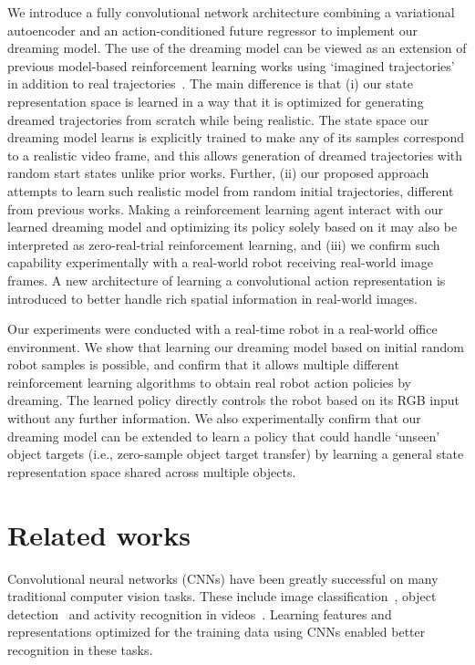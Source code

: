 \documentclass[letterpaper, 10 pt, conference]{ieeeconf}
\begin{document}
We introduce a fully convolutional network architecture combining a variational autoencoder and an action-conditioned future regressor to implement our dreaming model.
The use of the dreaming model can be viewed as an extension of previous model-based reinforcement learning works using `imagined trajectories' in addition to real trajectories~\cite{sutton1990integrated,heess2015learning,weber2017imagination}. The main difference is that (i) our state representation space is learned in a way that it is optimized for generating dreamed trajectories from scratch while being realistic.
The state space our dreaming model learns is explicitly trained to make any of its samples correspond to a realistic video frame, and this allows generation of dreamed trajectories with random start states unlike prior works. 
Further, (ii) our proposed approach attempts to learn such realistic model from random initial trajectories, different from previous works. Making a reinforcement learning agent interact with our learned dreaming model and optimizing its policy solely based on it may also be interpreted as zero-real-trial reinforcement learning, and (iii) we confirm such capability experimentally with a real-world robot receiving real-world image frames. A new architecture of learning a convolutional action representation is introduced to better handle rich spatial information in real-world images.


Our experiments were conducted with a real-time robot in a real-world office environment. We show that learning our dreaming model based on initial random robot samples is possible, and confirm that it allows multiple different reinforcement learning algorithms to obtain real robot action policies by dreaming. The learned policy directly controls the robot based on its RGB input without any further information. We also experimentally confirm that our dreaming model can be extended to learn a policy that could handle `unseen' object targets (i.e., zero-sample object target transfer) by learning a general state representation space shared across multiple objects.











\section{Related works}
Convolutional neural networks (CNNs) have been greatly successful on many traditional computer vision tasks. These include image classification~\cite{krizhevsky2012imagenet,simonyan2014very}, object detection~\cite{girshick2015fast,liu2016ssd} and activity recognition in videos~\cite{carreira2017quo,piergiovanni2018learning}. Learning features and representations optimized for the training data using CNNs enabled better recognition in these tasks.
\end{document}
